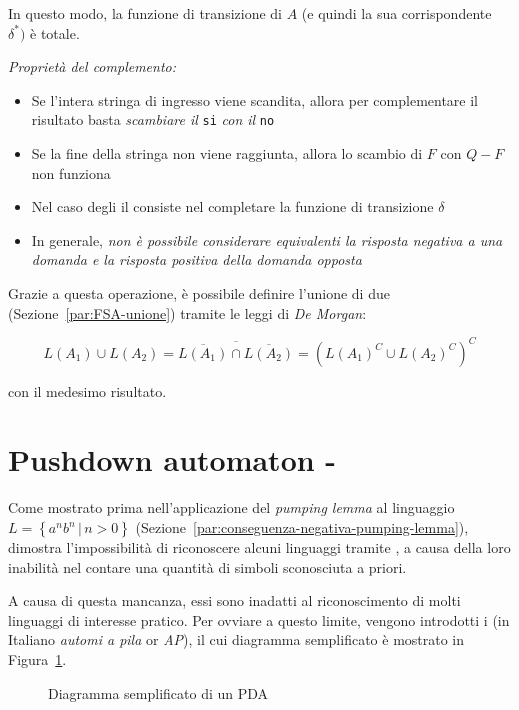 \documentclass[italian, 10pt]{article}
\begin{document}
In questo modo, la funzione di transizione di \(A\) (e quindi la sua corrispondente \(\delta^\ast)\) è totale.

\textit{Proprietà del complemento:}

\begin{itemize}
  \item Se l'intera stringa di ingresso viene scandita, allora per complementare il risultato basta \textit{scambiare il} \texttt{si} \textit{con il} \texttt{no}
  \item Se la fine della stringa non viene raggiunta, allora lo scambio di \(F\) con \(Q - F\) non funziona
  \item Nel caso degli \FSA il  consiste nel completare la funzione di transizione \(\delta\)
  \item In generale, \textit{non è possibile considerare equivalenti la risposta negativa a una domanda e la risposta positiva della domanda opposta}
\end{itemize}

Grazie a questa operazione, è possibile definire l'unione di due \FSA (Sezione~\ref{par:FSA-unione}) tramite le leggi di \textit{De Morgan}:

\[ L(A_1) \cup L(A_2) = \overline{\overline{L(A_1)} \cap \overline{L(A_2)}} = \left(L(A_1)^C \cup L(A_2)^C\right)^C \]

con il medesimo risultato.

\clearpage

\section{Pushdown automaton - \PDA}

Come mostrato prima nell'applicazione del \textit{pumping lemma} al linguaggio \( L = \left\{ a^n b^n \, | \, n > 0 \right\}\) (Sezione~\ref{par:conseguenza-negativa-pumping-lemma}), dimostra l'impossibilità di riconoscere alcuni linguaggi tramite \FSA, a causa della loro inabilità nel contare una quantità di simboli sconosciuta a priori.

A causa di questa mancanza, essi sono inadatti al riconoscimento di molti linguaggi di interesse pratico.
Per ovviare a questo limite, vengono introdotti i \PDA (in Italiano \textit{automi a pila} or \textit{AP}), il cui diagramma semplificato è mostrato in Figura~\ref{fig:diagramma-PDA}.

\begin{figure}[htbp]
  \bigskip
  \centering
  \caption{Diagramma semplificato di un PDA}
  \label{fig:diagramma-PDA}
  \bigskip
\end{figure}
\end{document}
